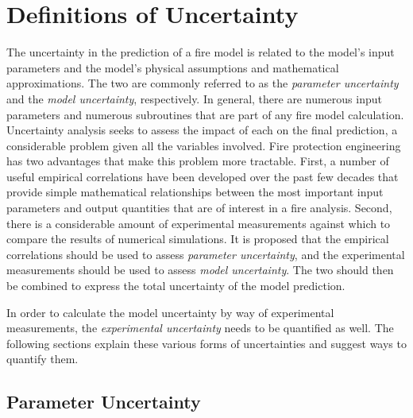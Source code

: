 \section{Definitions of Uncertainty}

The uncertainty in the prediction of a fire model is related to the model's input parameters and
the model's physical assumptions and mathematical approximations. The two are commonly referred to as
the {\em parameter uncertainty} and the {\em model uncertainty}, respectively. In general, there are numerous input
parameters and numerous subroutines that are part of any fire model calculation. Uncertainty analysis seeks to
assess the impact of each on the final prediction, a considerable problem given all the variables involved.
Fire protection engineering has two advantages that make this problem more tractable. First,
a number of useful empirical correlations have
been developed over the past few decades that provide simple mathematical relationships between the most important input parameters
and output quantities that are of interest in a fire analysis. Second, there is a considerable amount of
experimental measurements against which to compare the results of numerical simulations.
It is proposed that the empirical correlations should be used to assess {\em parameter uncertainty},
and the experimental measurements should be used
to assess {\em model uncertainty}. The two should then be combined to express the total uncertainty of the
model prediction.

In order to calculate the model uncertainty by way of experimental measurements, the {\em experimental uncertainty}
needs to be quantified as well. The following sections explain these various forms of uncertainties and suggest ways
to quantify them.

\subsection{Parameter Uncertainty}

